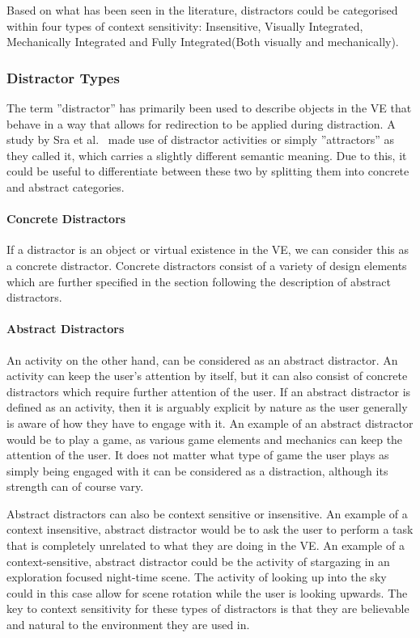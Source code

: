 Based on what has been seen in the literature, distractors could be categorised within four types of context sensitivity: Insensitive, Visually Integrated, Mechanically Integrated and Fully Integrated(Both visually and mechanically).

\subsubsection{Distractor Types}
The term ''distractor'' has primarily been used to describe objects in the VE that behave in a way that allows for redirection to be applied during distraction. A study by Sra et al.~\cite{sra2018vmotion} made use of distractor activities or simply ''attractors'' as they called it, which carries a slightly different semantic meaning. Due to this, it could be useful to differentiate between these two by splitting them into concrete and abstract categories.

\paragraph{Concrete Distractors}
If a distractor is an object or virtual existence in the VE, we can consider this as a concrete distractor. Concrete distractors consist of a variety of design elements which are further specified in the section following the description of abstract distractors. 

\paragraph{Abstract Distractors}
An activity on the other hand, can be considered as an abstract distractor. An activity can keep the user's attention by itself, but it can also consist of concrete distractors which require further attention of the user. If an abstract distractor is defined as an activity, then it is arguably explicit by nature as the user generally is aware of how they have to engage with it. An example of an abstract distractor would be to play a game, as various game elements and mechanics can keep the attention of the user. It does not matter what type of game the user plays as simply being engaged with it can be considered as a distraction, although its strength can of course vary. 

Abstract distractors can also be context sensitive or insensitive. An example of a context insensitive, abstract distractor would be to ask the user to perform a task that is completely unrelated to what they are doing in the VE. An example of a context-sensitive, abstract distractor could be the activity of stargazing in an exploration focused night-time scene. The activity of looking up into the sky could in this case allow for scene rotation while the user is looking upwards. The key to context sensitivity for these types of distractors is that they are believable and natural to the environment they are used in. 

